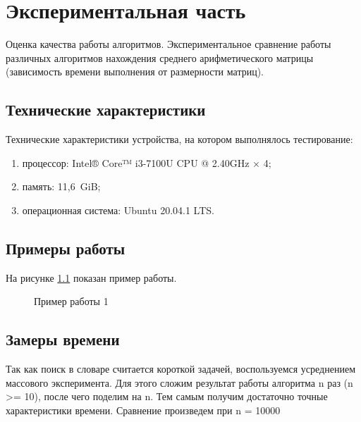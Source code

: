 


\chapter{Экспериментальная часть}\label{exp}

Оценка качества работы алгоритмов. Экспериментальное сравнение работы различных алгоритмов нахождения среднего арифметического матрицы
(зависимость времени выполнения от размерности матриц).

\section{Технические характеристики}\label{texcharacters}

Технические характеристики устройства, на котором выполнялось тестирование:

\begin{enumerate}
    \item процессор: Intel® Core™ i3-7100U CPU @ 2.40GHz × 4; 
    \item память: 11,6 GiB;
    \item операционная система: Ubuntu 20.04.1 LTS.
\end{enumerate}

\section{Примеры работы}\label{examples}

На рисунке \ref{ris:w1} показан пример работы.

  
\begin{figure}[H]
    \center{\texttt{[image: w1]}}
    \caption{Пример работы 1}
    \label{ris:w1}
\end{figure}

\section{Замеры времени}\label{experimentgraph}

Так как поиск в словаре считается короткой задачей, воспользуемся
усреднением массового эксперимента. Для этого сложим результат работы
алгоритма n раз (n >= 10), после чего поделим на n. Тем самым получим
достаточно точные характеристики времени. Сравнение произведем при n =
10000



